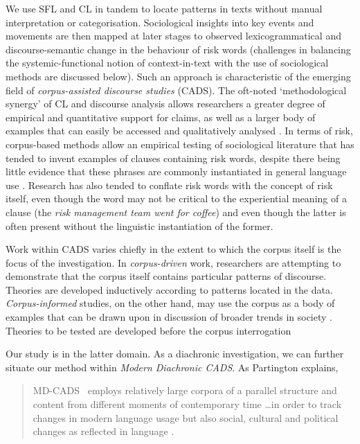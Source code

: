 		We use SFL and CL in tandem to locate patterns in texts without manual interpretation or categorisation. Sociological insights into key events and movements are then mapped at later stages to observed lexicogrammatical and discourse-semantic change in the behaviour of risk words (challenges in balancing the systemic-functional notion of context-in-text with the use of sociological methods are discussed below). Such an approach is characteristic of the emerging field of \emph{corpus-assisted discourse studies} (CADS). The oft-noted `methodological synergy' of CL and discourse analysis allows researchers a greater degree of empirical and quantitative support for claims, as well as a larger body of examples that can easily be accessed and qualitatively analysed \cite{baker_useful_2008}. In terms of risk, corpus-based methods allow an empirical testing of sociological literature that has tended to invent examples of clauses containing risk words, despite there being little evidence that these phrases are commonly instantiated in general language use \cite{hamilton_meanings_2007}. Research has also tended to conflate risk words with the concept of risk itself, even though the word may not be critical to the experiential meaning of a clause (the \emph{risk management team went for coffee}) and even though the latter is often present without the linguistic instantiation of the former.

		Work within CADS varies chiefly in the extent to which the corpus itself is the focus of the investigation. In \emph{corpus-driven} work, researchers are attempting to demonstrate that the corpus itself contains particular patterns of discourse. Theories are developed inductively according to patterns located in the data. \emph{Corpus-informed} studies, on the other hand, may use the corpus as a body of examples that can be drawn upon in discussion of broader trends in society \cite{baker_useful_2008}. Theories to be tested are developed before the corpus interrogation

		Our study is in the latter domain.
		As a diachronic investigation, we can further situate our method within \emph{Modern Diachronic CADS}. As Partington explains, 

		\begin{quote}
		\lbrack MD-CADS\rbrack~ employs relatively large corpora of a parallel structure and content from different moments of contemporary time \dots in order to track changes in modern language usage but also social, cultural and political changes as reflected in language \citeyear[p.~83]{partington_modern_2010}.
		\end{quote}

